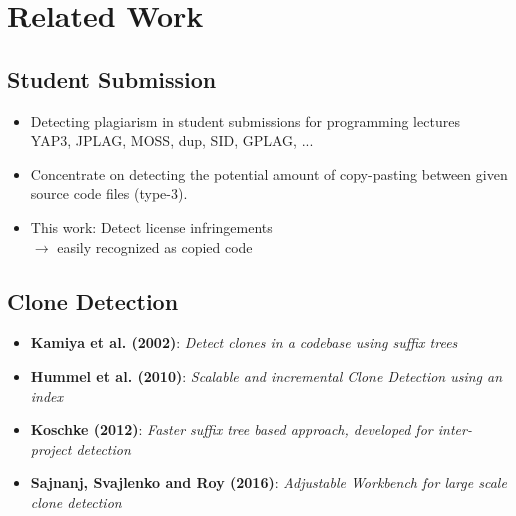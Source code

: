 
\section{Related Work}

\subsection{Student Submission}
\begin{frame}{\insertsubsection}
	\begin{itemize}
		\item Detecting plagiarism in student submissions for programming lectures\\
			YAP3, JPLAG, MOSS, dup, SID, GPLAG, ...
		\item Concentrate on detecting the potential amount of copy-pasting between given source code files (type-3).
		\item This work: Detect license infringements \\
		$\rightarrow$ easily recognized as copied code
	\end{itemize}
\end{frame}

\subsection{Clone Detection}
\begin{frame}{\insertsubsection}
	\begin{itemize}
		\item \textbf{Kamiya et al. \cite{kamiya2002ccfinder} (2002)}: \textit{Detect clones in a codebase using suffix trees}
		\item \textbf{Hummel et al. \cite{hummel2010index} (2010)}: \textit{Scalable and incremental Clone Detection using an index}
		\item \textbf{Koschke \cite{koschke2012large, koschke2014large} (2012)}: \textit{Faster suffix tree based approach, developed for inter-project detection}
		\item \textbf{Sajnanj, Svajlenko and Roy \cite{sajnani2016sourcerercc, svajlenko2017fast} (2016)}: \textit{Adjustable Workbench for large scale clone detection}
	\end{itemize}
\end{frame}

